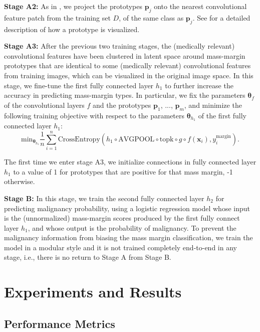 \documentclass[11pt]{article}
\begin{document}
\textbf{Stage A2:} As in \cite{PPNet}, we project the prototypes $\textbf{p}_j$ onto the nearest convolutional feature patch from the training set $D$, of the same class as $\textbf{p}_j$. See \cite{PPNet} for a detailed description of how a prototype is visualized.

\textbf{Stage A3:} 
After the previous two training stages, the (medically relevant) convolutional features have been clustered in latent space around mass-margin prototypes that are identical to some (medically relevant) convolutional features from training images, which can be visualized in the original image space. In this stage, we fine-tune the first fully connected layer $h_1$ to further increase the accuracy in predicting mass-margin types. 
In particular, we fix the parameters $\mathbf{\theta}_f$ of the convolutional layers $f$ and the prototypes $\mathbf{p}_1$, ..., $\mathbf{p}_m$, and minimize the following training objective with respect to the parameters $\mathbf{\theta}_{h_1}$ of the first fully connected layer $h_1$:
\begin{equation}
\textrm{min}_{\mathbf{\theta}_{h_1}} \frac{1}{n} \sum_{i=1}^n \textrm{CrossEntropy}(h_1 \circ \textrm{AVGPOOL} \circ \textrm{topk} \circ g \circ f(\mathbf{x}_i), y^{\text{margin}}_i). \label{eq:h1_training}
\end{equation}

The first time we enter stage A3, we initialize connections in fully connected layer $h_1$ to a value of 1 for prototypes that are positive for that mass margin, -1 otherwise.

\textbf{Stage B:} In this stage, we train the second fully connected layer $h_2$ for predicting malignancy probability, using a logistic regression model whose input is the (unnormalized) mass-margin scores produced by the first fully connect layer $h_1$, and whose output is the probability of malignancy. To prevent the malignancy information from biasing the mass margin classification, we train the model in a modular style and it is not trained completely end-to-end in any stage, i.e., there is no return to Stage A from Stage B.

\section{Experiments and Results} \label{sec:exps_and_results}

\subsection{Performance Metrics}
\end{document}
